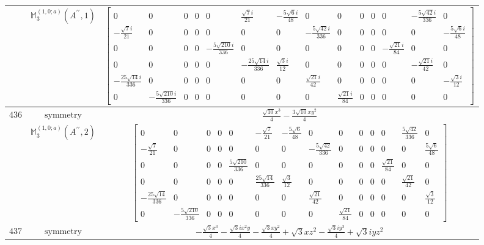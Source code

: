 \documentclass[fleqn,8pt,landscape]{jsarticle}
\begin{document}
\begin{longtable}{ccc}
$  $ & $ \mathbb{M}_{3}^{(1,0;a)}(A^{\prime\prime},1) $ & $ \begin{bmatrix} 0 & 0 & 0 & 0 & 0 & \frac{\sqrt{7} i}{21} & - \frac{5 \sqrt{6} i}{48} & 0 & 0 & 0 & 0 & 0 & - \frac{5 \sqrt{42} i}{336} & 0 \\ - \frac{\sqrt{7} i}{21} & 0 & 0 & 0 & 0 & 0 & 0 & - \frac{5 \sqrt{42} i}{336} & 0 & 0 & 0 & 0 & 0 & - \frac{5 \sqrt{6} i}{48} \\ 0 & 0 & 0 & 0 & - \frac{5 \sqrt{210} i}{336} & 0 & 0 & 0 & 0 & 0 & 0 & - \frac{\sqrt{21} i}{84} & 0 & 0 \\ 0 & 0 & 0 & 0 & 0 & - \frac{25 \sqrt{14} i}{336} & \frac{\sqrt{3} i}{12} & 0 & 0 & 0 & 0 & 0 & - \frac{\sqrt{21} i}{42} & 0 \\ - \frac{25 \sqrt{14} i}{336} & 0 & 0 & 0 & 0 & 0 & 0 & \frac{\sqrt{21} i}{42} & 0 & 0 & 0 & 0 & 0 & - \frac{\sqrt{3} i}{12} \\ 0 & - \frac{5 \sqrt{210} i}{336} & 0 & 0 & 0 & 0 & 0 & 0 & \frac{\sqrt{21} i}{84} & 0 & 0 & 0 & 0 & 0 \end{bmatrix} $ \\ \hline
$ 436 $ & $ \text{symmetry} $ & $ \frac{\sqrt{10} x^{3}}{4} - \frac{3 \sqrt{10} x y^{2}}{4} $ \\
$  $ & $ \mathbb{M}_{3}^{(1,0;a)}(A^{\prime\prime},2) $ & $ \begin{bmatrix} 0 & 0 & 0 & 0 & 0 & - \frac{\sqrt{7}}{21} & - \frac{5 \sqrt{6}}{48} & 0 & 0 & 0 & 0 & 0 & \frac{5 \sqrt{42}}{336} & 0 \\ - \frac{\sqrt{7}}{21} & 0 & 0 & 0 & 0 & 0 & 0 & - \frac{5 \sqrt{42}}{336} & 0 & 0 & 0 & 0 & 0 & \frac{5 \sqrt{6}}{48} \\ 0 & 0 & 0 & 0 & \frac{5 \sqrt{210}}{336} & 0 & 0 & 0 & 0 & 0 & 0 & \frac{\sqrt{21}}{84} & 0 & 0 \\ 0 & 0 & 0 & 0 & 0 & \frac{25 \sqrt{14}}{336} & \frac{\sqrt{3}}{12} & 0 & 0 & 0 & 0 & 0 & \frac{\sqrt{21}}{42} & 0 \\ - \frac{25 \sqrt{14}}{336} & 0 & 0 & 0 & 0 & 0 & 0 & \frac{\sqrt{21}}{42} & 0 & 0 & 0 & 0 & 0 & \frac{\sqrt{3}}{12} \\ 0 & - \frac{5 \sqrt{210}}{336} & 0 & 0 & 0 & 0 & 0 & 0 & \frac{\sqrt{21}}{84} & 0 & 0 & 0 & 0 & 0 \end{bmatrix} $ \\ \hline
$ 437 $ & $ \text{symmetry} $ & $ - \frac{\sqrt{3} x^{3}}{4} - \frac{\sqrt{3} i x^{2} y}{4} - \frac{\sqrt{3} x y^{2}}{4} + \sqrt{3} x z^{2} - \frac{\sqrt{3} i y^{3}}{4} + \sqrt{3} i y z^{2} $ \\

\end{longtable}
\end{document}
